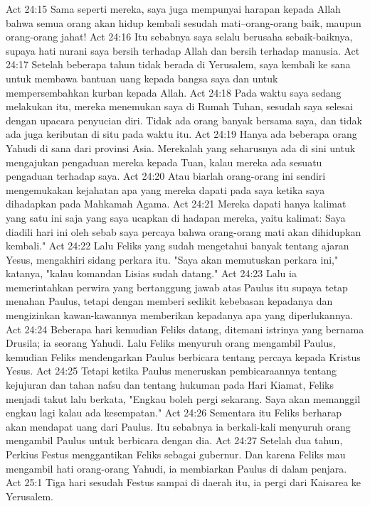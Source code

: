 Act 24:15  Sama seperti mereka, saya juga mempunyai harapan kepada Allah bahwa semua orang akan hidup kembali sesudah mati--orang-orang baik, maupun orang-orang jahat!
Act 24:16  Itu sebabnya saya selalu berusaha sebaik-baiknya, supaya hati nurani saya bersih terhadap Allah dan bersih terhadap manusia.
Act 24:17  Setelah beberapa tahun tidak berada di Yerusalem, saya kembali ke sana untuk membawa bantuan uang kepada bangsa saya dan untuk mempersembahkan kurban kepada Allah.
Act 24:18  Pada waktu saya sedang melakukan itu, mereka menemukan saya di Rumah Tuhan, sesudah saya selesai dengan upacara penyucian diri. Tidak ada orang banyak bersama saya, dan tidak ada juga keributan di situ pada waktu itu.
Act 24:19  Hanya ada beberapa orang Yahudi di sana dari provinsi Asia. Merekalah yang seharusnya ada di sini untuk mengajukan pengaduan mereka kepada Tuan, kalau mereka ada sesuatu pengaduan terhadap saya.
Act 24:20  Atau biarlah orang-orang ini sendiri mengemukakan kejahatan apa yang mereka dapati pada saya ketika saya dihadapkan pada Mahkamah Agama.
Act 24:21  Mereka dapati hanya kalimat yang satu ini saja yang saya ucapkan di hadapan mereka, yaitu kalimat: Saya diadili hari ini oleh sebab saya percaya bahwa orang-orang mati akan dihidupkan kembali."
Act 24:22  Lalu Feliks yang sudah mengetahui banyak tentang ajaran Yesus, mengakhiri sidang perkara itu. "Saya akan memutuskan perkara ini," katanya, "kalau komandan Lisias sudah datang."
Act 24:23  Lalu ia memerintahkan perwira yang bertanggung jawab atas Paulus itu supaya tetap menahan Paulus, tetapi dengan memberi sedikit kebebasan kepadanya dan mengizinkan kawan-kawannya memberikan kepadanya apa yang diperlukannya.
Act 24:24  Beberapa hari kemudian Feliks datang, ditemani istrinya yang bernama Drusila; ia seorang Yahudi. Lalu Feliks menyuruh orang mengambil Paulus, kemudian Feliks mendengarkan Paulus berbicara tentang percaya kepada Kristus Yesus.
Act 24:25  Tetapi ketika Paulus meneruskan pembicaraannya tentang kejujuran dan tahan nafsu dan tentang hukuman pada Hari Kiamat, Feliks menjadi takut lalu berkata, "Engkau boleh pergi sekarang. Saya akan memanggil engkau lagi kalau ada kesempatan."
Act 24:26  Sementara itu Feliks berharap akan mendapat uang dari Paulus. Itu sebabnya ia berkali-kali menyuruh orang mengambil Paulus untuk berbicara dengan dia.
Act 24:27  Setelah dua tahun, Perkius Festus menggantikan Feliks sebagai gubernur. Dan karena Feliks mau mengambil hati orang-orang Yahudi, ia membiarkan Paulus di dalam penjara.
Act 25:1  Tiga hari sesudah Festus sampai di daerah itu, ia pergi dari Kaisarea ke Yerusalem.
